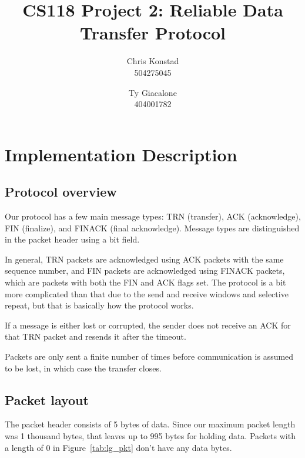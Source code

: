 \documentclass[letterpaper,twocolumn,10pt]{article}
\begin{document}
\date{}

\title{\Large \bf CS118 Project 2: Reliable Data Transfer Protocol}

\author{
{\rm Chris Konstad}\\
504275045
\and
{\rm Ty Giacalone}\\
404001782
} %

\maketitle

\thispagestyle{empty}

\section{Implementation Description}
\subsection{Protocol overview}
Our protocol has a few main message types: TRN (transfer), ACK (acknowledge), FIN (finalize), and FINACK (final acknowledge).
Message types are distinguished in the packet header using a bit field.

In general, TRN packets are acknowledged using ACK packets with the same sequence number, and FIN packets are acknowledged using FINACK packets, which are packets with both the FIN and ACK flags set.
The protocol is a bit more complicated than that due to the send and receive windows and selective repeat, but that is basically how the protocol works.

If a message is either lost or corrupted, the sender does not receive an ACK for that TRN packet and resends it after the timeout.

Packets are only sent a finite number of times before communication is assumed to be lost, in which case the transfer closes.

\subsection{Packet layout}
The packet header consists of 5 bytes of data.
Since our maximum packet length was 1 thousand bytes, that leaves up to 995 bytes for holding data.
Packets with a length of 0 in Figure~\ref{tab:lg_pkt} don't have any data bytes.
\end{document}
